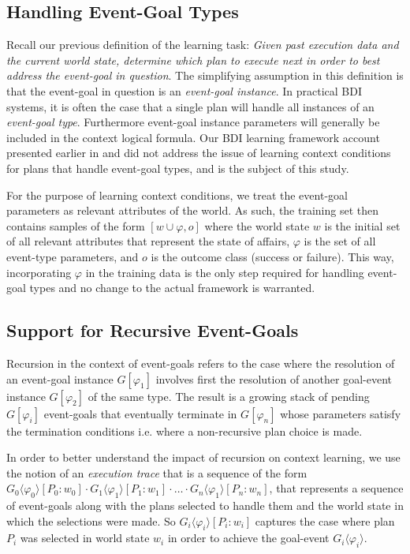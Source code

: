 \subsection{Handling Event-Goal Types}

Recall our previous definition of the learning task: \textit{Given past execution data and the current world state, determine which plan to execute next in order to best address the event-goal in question}. The simplifying assumption in this definition is that the event-goal in question is an \textit{event-goal instance}. In practical BDI systems, it is often the case that a single plan will handle all instances of an \textit{event-goal type}. Furthermore event-goal instance parameters will generally be included in the context logical formula. Our BDI learning framework account presented earlier in \cite{Airiau:IJAT:09} and \cite{Singh:AAMAS10} did not address the issue of learning context conditions for plans that handle event-goal types, and is the subject of this study.

For the purpose of learning context conditions, we treat the event-goal parameters as relevant attributes of the world. As such, the training set then contains samples of the form $[w \cup \varphi,o]$ where the world state $w$ is the initial set of all relevant attributes that represent the state of affairs, $\varphi$ is the set of all event-type parameters, and $o$ is the outcome class (success or failure). This way, incorporating $\varphi$ in the training data is the only step required for handling event-goal types and no change to the actual framework is warranted.

\subsection{Support for Recursive Event-Goals}

Recursion in the context of event-goals refers to the case where the resolution of an event-goal instance $G[\varphi_1]$ involves first the resolution of another goal-event instance $G[\varphi_2]$ of the same type. The result is a growing stack of pending $G[\varphi_i]$ event-goals that eventually terminate in $G[\varphi_n]$ whose parameters satisfy the termination conditions i.e. where a non-recursive plan choice is made.

In order to better understand the impact of recursion on context learning, we use the notion of an \textit{execution trace} that is a sequence of the form $G_0\langle\varphi_0\rangle[P_0:w_0] \cdot G_1\langle\varphi_1\rangle[P_1:w_1] \cdot \ldots \cdot G_n\langle\varphi_1\rangle[P_n:w_n]$, that represents a sequence of event-goals along with the plans selected to handle them and the world state in which the selections were made. So $G_i\langle\varphi_i\rangle[P_i:w_i]$ captures the case where plan $P_i$ was selected in world state $w_i$ in order to achieve the goal-event $G_i\langle\varphi_i\rangle$.

